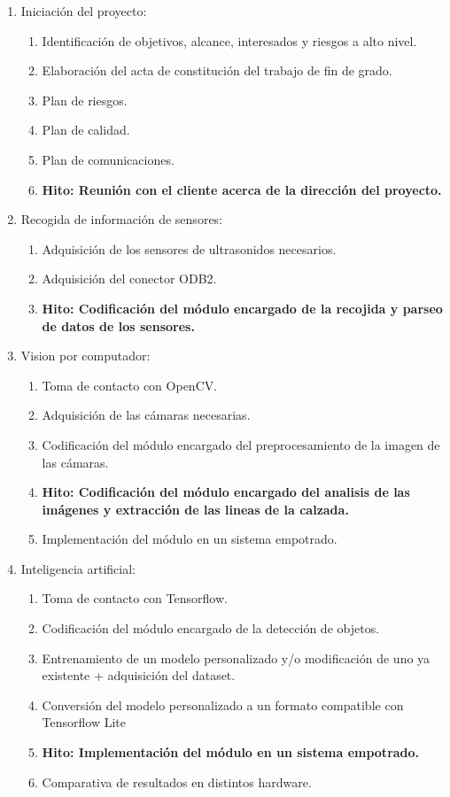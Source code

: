 \begin{enumerate}
  \item Iniciación del proyecto:
  \begin{enumerate}
    \item Identificación de objetivos, alcance, interesados y riesgos a alto nivel.
    \item Elaboración del acta de constitución del trabajo de fin de grado.
    \item Plan de riesgos.
    \item Plan de calidad.
    \item Plan de comunicaciones.
    \item \textbf{Hito: Reunión con el cliente acerca de la dirección del proyecto.}
  \end{enumerate}


  \item Recogida de información de sensores:
  \begin{enumerate}
    \item Adquisición de los sensores de ultrasonidos necesarios.
    \item Adquisición del conector ODB2.
    \item \textbf{Hito: Codificación del módulo encargado de la recojida y parseo de datos de los sensores.}
  \end{enumerate}


  \item Vision por computador:
  \begin{enumerate}
    \item Toma de contacto con OpenCV.
    \item Adquisición de las cámaras necesarias.
    \item Codificación del módulo encargado del preprocesamiento de la imagen de las cámaras.
    \item \textbf{Hito: Codificación del módulo encargado del analisis de las imágenes y extracción de las lineas de la calzada.}
    \item Implementación del módulo en un sistema empotrado.
  \end{enumerate}


  \item Inteligencia artificial:
  \begin{enumerate}
    \item Toma de contacto con Tensorflow.
    \item Codificación del módulo encargado de la detección de objetos.
    \item Entrenamiento de un modelo personalizado y/o modificación de uno ya existente + adquisición del dataset.
    \item Conversión del modelo personalizado a un formato compatible con Tensorflow Lite
    \item \textbf{Hito: Implementación del módulo en un sistema empotrado.}
    \item Comparativa de resultados en distintos hardware.
  \end{enumerate}


\end{enumerate}
